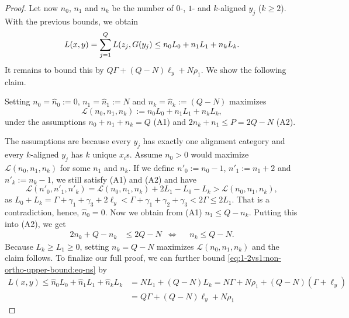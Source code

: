 \begin{proof}
Let now $n_0$, $n_1$ and $n_k$ be the number of $0$-, $1$- and $k$-aligned $y_j$ ($k \geq 2$).
With the previous bounds, we obtain
\begin{equation}
\label{eq:1-2vs1:non-ortho-upper-bound:eq-ns}
	L(x,y) = \sum_{j=1}^Q L(z_j, G(y_j) \leq n_0 L_0 + n_1 L_1 + n_k L_k .
\end{equation}
It remains to bound this by $Q\Gamma + (Q-N)\ell_y + N\rho_1$. 
We show the following claim.
\begin{claim}
Setting $n_0 = \hat{n}_0 := 0$, $n_1 = \hat{n}_1 := N$ and $n_k = \hat{n}_k := (Q-N)$ maximizes
\[
\mathcal{L}(n_0, n_1, n_k) := n_0 L_0 + n_1 L_1 + n_k L_k,
\]
under the assumptions $n_0 + n_1 + n_k = Q$ (A1) and $2n_k + n_1 \leq P = 2Q - N$ (A2).
\end{claim}
The assumptions are because every $y_j$ has exactly one alignment category and every $k$-aligned $y_j$ has $k$ unique $x_i$s.
Assume $n_0 > 0$ would maximize $\mathcal{L}(n_0, n_1, n_k)$ for some $n_1$ and $n_k$.
If we define $n'_0 := n_0 - 1$, $n'_1 := n_1 + 2$ and $n'_k := n_k - 1$, we still satisfy (A1) and (A2) and have
\[
	\mathcal{L}(n'_0, n'_1, n'_k) = \mathcal{L}(n_0, n_1, n_k) + 2L_1 - L_0 - L_k > \mathcal{L}(n_0, n_1, n_k),
\]
as $L_0 + L_k = \Gamma + \gamma_1 + \gamma_3 + 2\ell_y < \Gamma + \gamma_1 + \gamma_2 + \gamma_3 < 2\Gamma \leq 2L_1$.
That is a contradiction, hence, $\hat{n}_0 = 0$.
Now we obtain from (A1) $n_1 \leq Q - n_k$.
Putting this into (A2), we get
\begin{align*}
2n_k + Q - n_k &\leq 2Q - N %
&\Leftrightarrow& %
&n_k \leq Q - N.
\end{align*}
Because $L_k \geq L_1 \geq 0$, setting $n_k = Q-N$ maximizes $\mathcal{L}(n_0, n_1, n_k)$ and the claim follows.
%
%
To finalize our full proof, we can further bound \autoref{eq:1-2vs1:non-ortho-upper-bound:eq-ns} by
\begin{align*}
L(x,y) \leq \hat{n}_0 L_0 + \hat{n}_1 L_1 + \hat{n}_k L_k &= NL_1 + (Q-N) L_k  = N\Gamma + N\rho_1 + (Q-N)(\Gamma + \ell_y) \\
	&= Q\Gamma + (Q-N)\ell_y + N\rho_1
\end{align*}%
\end{proof}%
%



